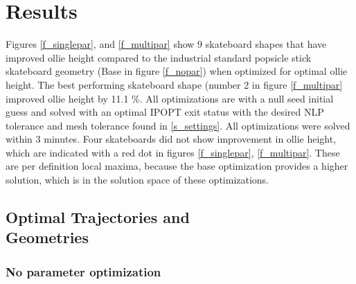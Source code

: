 \documentclass[default,iicol]{sn-jnl}
\begin{document}
{\section{Results}
Figures \ref{f_singlepar}, and \ref{f_multipar} show 9 skateboard shapes that have improved ollie height compared to the industrial standard popsicle stick skateboard geometry (Base in figure \ref{f_nopar}) when optimized for optimal ollie height. The best performing skateboard shape (number 2 in figure \ref{f_multipar} improved ollie height by 11.1 \%. All optimizations are with a null seed initial guess and solved with an optimal IPOPT exit status with the desired NLP tolerance and mesh tolerance found in \ref{s_settings}. All optimizations were solved within 3 minutes. Four skateboards did not show improvement in ollie height, which are indicated with a red dot in figures \ref{f_singlepar}, \ref{f_multipar}. These are per definition local maxima, because the base optimization provides a higher solution, which is in the solution space of these optimizations. 

\subsection{Optimal Trajectories and \\Geometries}
\subsubsection{No parameter optimization}

\begin{figure}[!t]
\captionsetup[subfigure]{}

       

\end{figure}}
\end{document}
